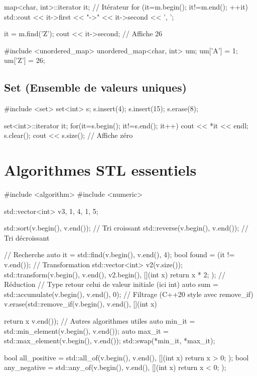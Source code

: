 \documentclass{article}
\begin{document}
\begin{multicols*}{4}
\begin{cppcode}
map<char, int>::iterator it; // Itérateur
for (it=m.begin(); it!=m.end(); ++it)
    std::cout << it->first << "->" << it->second << ', ';

it = m.find('Z');
cout << it->second; // Affiche 26

#include <unordered_map>
unordered_map<char, int> um;
um['A'] = 1; um['Z'] = 26;
\end{cppcode}

\subsection*{Set (Ensemble de valeurs uniques)}

\begin{cppcode}
#include <set>
set<int> s;
s.insert(4);
s.insert(15);
s.erase(8);

set<int>::iterator it;
for(it=s.begin(); it!=s.end(); it++) {
    cout << *it << endl; }
s.clear();
cout << s.size(); // Affiche zéro
\end{cppcode}

\section*{Algorithmes STL essentiels}

\begin{cppcode}
#include <algorithm>
#include <numeric>

std::vector<int> v{3, 1, 4, 1, 5};

std::sort(v.begin(), v.end()); // Tri croissant
std::reverse(v.begin(), v.end()); // Tri décroissant

// Recherche
auto it = std::find(v.begin(), v.end(), 4);
bool found = (it != v.end());
// Transformation
std::vector<int> v2(v.size());
std::transform(v.begin(), v.end(), v2.begin(),
               [](int x) { return x * 2; });
// Réduction
// Type retour celui de valeur initiale (ici int)
auto sum = std::accumulate(v.begin(), v.end(), 0);
// Filtrage (C++20 style avec remove_if)
v.erase(std::remove_if(v.begin(), v.end(),
                       [](int x) { return x %
        v.end());
// Autres algorithmes utiles
auto min_it = std::min_element(v.begin(), v.end());
auto max_it = std::max_element(v.begin(), v.end());
std::swap(*min_it, *max_it);

bool all_positive = std::all_of(v.begin(), v.end(),
                        [](int x) { return x > 0; });
bool any_negative = std::any_of(v.begin(), v.end(),
                        [](int x) { return x < 0; });

}
\end{cppcode}
\end{multicols*}
\end{document}
